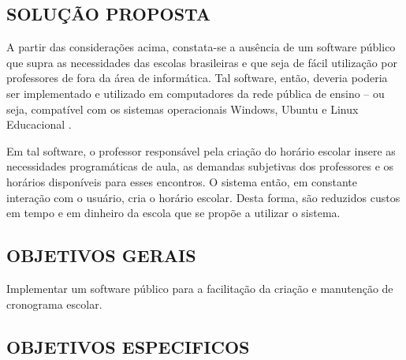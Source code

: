 \documentclass[12pt,a4paper]{article}
\begin{document}
		\subsection{SOLUÇÃO PROPOSTA}

			 \par A partir das considerações acima, constata-se a ausência de um software público \cite{publico} que supra as necessidades das escolas brasileiras e que seja de fácil utilização por professores de fora da área de informática. Tal software, então, deveria poderia ser implementado e utilizado em computadores da rede pública de ensino -- ou seja, compatível com os sistemas operacionais Windows, Ubuntu e Linux Educacional \cite{proinfo}.

			 \par Em tal software, o professor responsável pela criação do horário escolar insere as necessidades programáticas de aula, as demandas subjetivas dos professores e os horários disponíveis para esses encontros. O sistema então, em constante interação com o usuário, cria o horário escolar.  Desta forma, são reduzidos custos em tempo e em dinheiro da escola que se propõe a utilizar o sistema.


		\subsection{OBJETIVOS GERAIS}

			\par Implementar um software público para a facilitação da criação e manutenção de cronograma escolar.


		\subsection{OBJETIVOS ESPECIFICOS}
\end{document}
